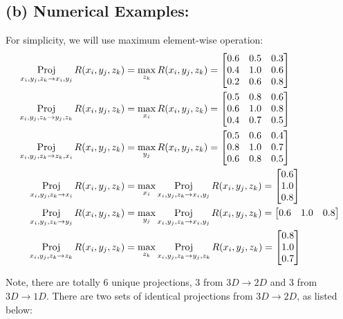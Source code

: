 \documentclass{tron}
\begin{document}
\subsection{(b) Numerical Examples:}
For simplicity, we will use maximum element-wise operation:
\begin{align}
	\underset{x_i,y_j,z_k \rightarrow x_i,y_j}{\mathrm{Proj}}\, R(x_i,y_j,z_k) & = \max_{z_k} R(x_i,y_j,z_k) = 
	\begin{bmatrix} 0.6 & 0.5 & 0.3 \\ 0.4 & 1.0 & 0.6 \\ 0.2 & 0.6 & 0.8 \end{bmatrix} \\
	\underset{x_i,y_j,z_k \rightarrow y_j,z_k}{\mathrm{Proj}}\, R(x_i,y_j,z_k) & = \max_{x_i} R(x_i,y_j,z_k) = 
	\begin{bmatrix} 0.5 & 0.8 & 0.6 \\ 0.6 & 1.0 & 0.8 \\ 0.4 & 0.7 & 0.5 \end{bmatrix} \\
	\underset{x_i,y_j,z_k \rightarrow z_k,x_i}{\mathrm{Proj}}\, R(x_i,y_j,z_k) & = \max_{y_j} R(x_i,y_j,z_k) = 
	\begin{bmatrix} 0.5 & 0.6 & 0.4 \\ 0.8 & 1.0 & 0.7 \\ 0.6 & 0.8 & 0.5 \end{bmatrix} \\
	\underset{x_i,y_j,z_k \rightarrow x_i}{\mathrm{Proj}}\, R(x_i,y_j,z_k) & = \max_{x_i} \underset{x_i,y_j,z_k \rightarrow x_i,y_j}{\mathrm{Proj}}\, R(x_i,y_j,z_k) = 
	\begin{bmatrix} 0.6 \\ 1.0 \\ 0.8 \end{bmatrix} \\
	\underset{x_i,y_j,z_k \rightarrow y_j}{\mathrm{Proj}}\, R(x_i,y_j,z_k) & = \max_{y_j} \underset{x_i,y_j,z_k \rightarrow x_i,y_j}{\mathrm{Proj}}\, R(x_i,y_j,z_k) = 
	\begin{bmatrix} 0.6 & 1.0 & 0.8 \end{bmatrix} \\
	\underset{x_i,y_j,z_k \rightarrow z_k}{\mathrm{Proj}}\, R(x_i,y_j,z_k) & = \max_{z_k} \underset{x_i,y_j,z_k \rightarrow y_j,z_k}{\mathrm{Proj}}\, R(x_i,y_j,z_k) = 
	\begin{bmatrix} 0.8 \\ 1.0 \\ 0.7 \end{bmatrix} 
\end{align}

Note, there are totally 6 unique projections, 3 from $3D\rightarrow 2D$ and 3 from $3D \rightarrow 1D$. There are two sets of identical projections from $3D \rightarrow 2D$, as listed below:
\end{document}
